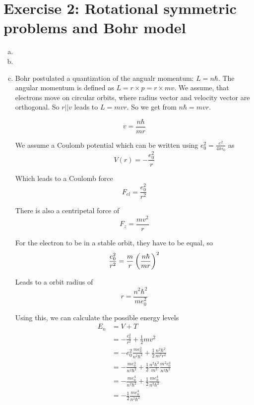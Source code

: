 \documentclass[a4paper,german,12pt,smallheadings]{scrartcl}
\begin{document}
\section*{Exercise 2: Rotational symmetric problems and Bohr model}
\begin{enumerate}[a)]
  \item
  \item
  \item
    Bohr postulated a quantization of the angualr momentum: $L = n \hbar$. The
    angular momentum is defined as $L = r \times p = r \times mv$. We assume,
    that electrons move on circular orbits, where radius vector and velocity
    vector are orthogonal. So $r || v$ leads to $L = mvr$. So we get from $n
    \hbar = mvr$.

    \begin{equation*}
      v = \frac{n \hbar}{mr}
    \end{equation*}

    We assume a Coulomb potential which can be written using $e_0^2 =
    \frac{e^2}{4 \pi \epsilon_0}$ as
    \begin{equation*}
      V(r) = - \frac{e_0^2}{r}
    \end{equation*}

    Which leads to a Coulomb force
    \begin{equation*}
      F_{el} = \frac{e_0^2}{r^2}
    \end{equation*}

    There is also a centripetal force of
    \begin{equation*}
      F_{z} = \frac{mv^2}{r}
    \end{equation*}

    For the electron to be in a stable orbit, they have to be equal, so
    \begin{equation*}
      \frac{e_0^2}{r^2} = \frac{m}{r} \del{\frac{n \hbar}{m r}}^2
    \end{equation*}

    Leads to a orbit radius of
    \begin{equation*}
      r = \frac{n^2\hbar^2}{me_0^2}
    \end{equation*}

    Using this, we can calculate the possible energy levels
    \begin{align*}
      E_n &= V + T \\
          &= -\frac{e_0^2}{r^2} + \frac{1}{2} m v^2 \\
          &= -e_0^2 \frac{me_0^2}{n^2 \hbar^2} + \frac{1}{2} \frac{n^2 \hbar^2}{m^2 r^2} \\
          &= -\frac{me_0^4}{n^2 \hbar^2} + \frac{1}{2} \frac{n^2 \hbar^2}{m^2} \frac{m^2e_0^4}{n^2 \hbar^2} \\
          &= -\frac{me_0^4}{n^2 \hbar^2} + \frac{1}{2} \frac{me_0^4}{n^2 \hbar^2} \\
          &= -\frac{1}{2} \frac{me_0^4}{n^2 \hbar^2}
    \end{align*}


\end{enumerate}
\end{document}
